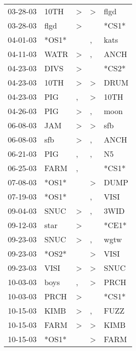 \begin{supertabular}{lllll}
 03-28-03 &   10TH &     \textgreater &     \textgreater &   flgd \\
 03-28-03 &   flgd &     \textgreater &                  &  *CS1* \\
 04-01-03 &  *OS1* &                  &                , &   kats \\
 04-11-03 &   WATR &     \textgreater &                , &   ANCH \\
 04-23-03 &   DIVS &     \textgreater &                  &  *CS2* \\
 04-23-03 &   10TH &     \textgreater &     \textgreater &   DRUM \\
 04-23-03 &    PIG &                , &     \textgreater &   10TH \\
 04-26-03 &    PIG &     \textgreater &                , &   moon \\
 06-08-03 &    JAM &     \textgreater &     \textgreater &    sfb \\
 06-08-03 &    sfb &     \textgreater &                , &   ANCH \\
 06-21-03 &    PIG &                , &                , &     N5 \\
 06-25-03 &   FARM &                , &                  &  *CS1* \\
 07-08-03 &  *OS1* &                  &     \textgreater &   DUMP \\
 07-19-03 &  *OS1* &                  &                , &   VISI \\
 09-04-03 &   SNUC &     \textgreater &                , &   3WID \\
 09-12-03 &   star &     \textgreater &                  &  *CE1* \\
 09-23-03 &   SNUC &     \textgreater &                , &   wgtw \\
 09-23-03 &  *OS2* &                  &     \textgreater &   VISI \\
 09-23-03 &   VISI &     \textgreater &     \textgreater &   SNUC \\
 10-03-03 &   boys &                , &     \textgreater &   PRCH \\
 10-03-03 &   PRCH &     \textgreater &                  &  *CS1* \\
 10-15-03 &   KIMB &     \textgreater &                , &   FUZZ \\
 10-15-03 &   FARM &     \textgreater &     \textgreater &   KIMB \\
 10-15-03 &  *OS1* &                  &     \textgreater &   FARM \\

\end{supertabular}
